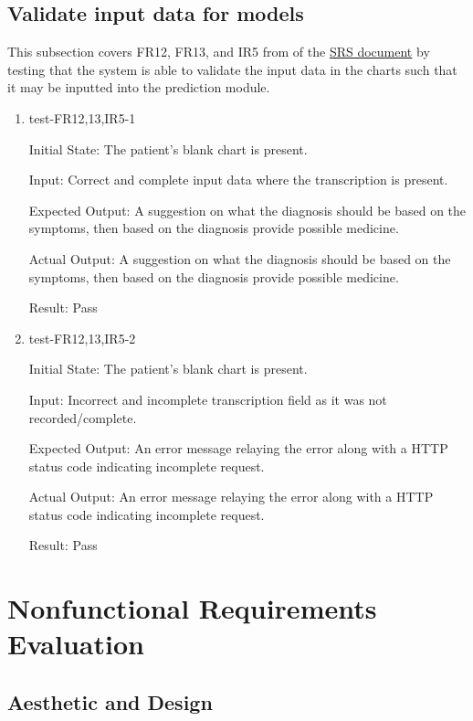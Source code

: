 \documentclass[12pt, titlepage]{article}
\begin{document}
\subsection{Validate input data for models} \label{section:3.7}

This subsection covers FR12, FR13, and IR5 from of the \href{https://github.com/Inreet-Kaur/capstone/blob/main/docs/SRS/SRS.pdf} {SRS document} by testing that the system is able to validate the input data in the charts such that it may be inputted into the prediction module.

\begin{enumerate}

  \item{test-FR12,13,IR5-1} \label{test-FR12,13,IR5-1}
  
  Initial State: The patient's blank chart is present.

  Input: Correct and complete input data where the transcription is present.

  Expected Output: A suggestion on what the diagnosis should be based on the symptoms, then based on the diagnosis provide possible medicine.

  Actual Output: A suggestion on what the diagnosis should be based on the symptoms, then based on the diagnosis provide possible medicine.

  Result: Pass

  \item{test-FR12,13,IR5-2} \label{test-FR12,13,IR5-2}
  
  Initial State: The patient's blank chart is present.

  Input: Incorrect and incomplete transcription field as it was not recorded/complete.

  Expected Output: An error message relaying the error along with a HTTP status code indicating incomplete request.

  Actual Output: An error message relaying the error along with a HTTP status code indicating incomplete request.

  Result: Pass

\end{enumerate}

\section{Nonfunctional Requirements Evaluation} \label{section:4}

\subsection{Aesthetic and Design} \label{section:4.1}
\end{document}
